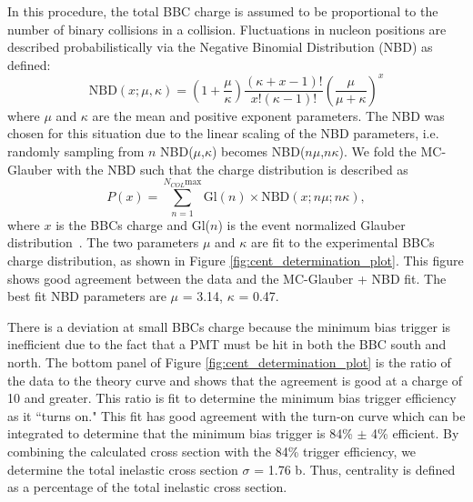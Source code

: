In this procedure, the total BBC charge is assumed to be proportional to the number of binary collisions in a \pau collision. Fluctuations in nucleon positions are described probabilistically via the Negative Binomial Distribution (NBD) as defined:
\begin{equation}
   \textrm{NBD}(x;\mu,\kappa) = \left(1+\frac{\mu}{\kappa}\right)\frac{(\kappa+x-1)!}{x!(\kappa-1)!}\left(\frac{\mu}{\mu+\kappa}\right)^x
\end{equation}
where $\mu$ and $\kappa$ are the mean and positive exponent parameters. The NBD was chosen for this situation due to the linear scaling of the NBD parameters, i.e. randomly sampling from $n$ NBD($\mu$,$\kappa$) becomes NBD($n\mu$,$n\kappa$). We fold the MC-Glauber with the NBD such that the charge distribution is described as
\begin{equation}
   P(x) = \sum^{N_{COL}\textrm{max}}_{n=1} \textrm{Gl}(n)\times \textrm{NBD}(x;n\mu;n\kappa),
\end{equation}
where $x$ is the BBCs charge and Gl($n$) is the event normalized Glauber distribution~\cite{PhysRevC.90.034902}. The two parameters $\mu$ and $\kappa$ are fit to the experimental BBCs charge distribution, as shown in Figure \ref{fig:cent_determination_plot}. This figure shows good agreement between the data and the MC-Glauber + NBD fit. The best fit NBD parameters are $\mu$ = 3.14, $\kappa$ = 0.47. 

There is a deviation at small BBCs charge because the minimum bias trigger is inefficient due to the fact that a PMT must be hit in both the BBC south and north. The bottom panel of Figure \ref{fig:cent_determination_plot} is the ratio of the data to the theory curve and shows that the agreement is good at a charge of 10 and greater. This ratio is fit to determine the minimum bias trigger efficiency as it ``turns on." This fit has good agreement with the turn-on curve which can be integrated to determine that the minimum bias trigger is 84\% $\pm$ 4\% efficient. By combining the calculated \pau cross section with the 84\% trigger efficiency, we determine the total inelastic \pau cross section $\sigma$ = 1.76 b. Thus, centrality is defined as a percentage of the total inelastic cross section.

